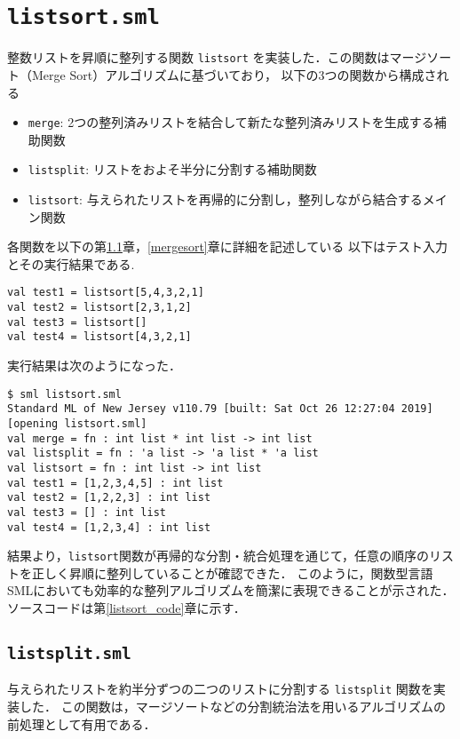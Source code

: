 \documentclass[autodetect-engine,dvi=dvipdfmx,ja=standard,
               a4j,11pt]{bxjsarticle}
\begin{document}
\section{\texttt{listsort.sml}}
整数リストを昇順に整列する関数 \verb|listsort| を実装した．この関数はマージソート（Merge Sort）アルゴリズムに基づいており，
以下の3つの関数から構成される
\begin{itemize}
  \item \texttt{merge}: 2つの整列済みリストを結合して新たな整列済みリストを生成する補助関数
  \item \texttt{listsplit}: リストをおよそ半分に分割する補助関数
  \item \texttt{listsort}: 与えられたリストを再帰的に分割し，整列しながら結合するメイン関数
\end{itemize}
各関数を以下の第\ref{listsplit}章，\ref{mergesort}章に詳細を記述している
以下はテスト入力とその実行結果である.
\begin{Verbatim}
val test1 = listsort[5,4,3,2,1]
val test2 = listsort[2,3,1,2]
val test3 = listsort[]
val test4 = listsort[4,3,2,1]
\end{Verbatim}
実行結果は次のようになった．
\begin{Verbatim}
$ sml listsort.sml 
Standard ML of New Jersey v110.79 [built: Sat Oct 26 12:27:04 2019]
[opening listsort.sml]
val merge = fn : int list * int list -> int list
val listsplit = fn : 'a list -> 'a list * 'a list
val listsort = fn : int list -> int list
val test1 = [1,2,3,4,5] : int list
val test2 = [1,2,2,3] : int list
val test3 = [] : int list
val test4 = [1,2,3,4] : int list  
\end{Verbatim}
結果より，\texttt{listsort}関数が再帰的な分割・統合処理を通じて，任意の順序のリストを正しく昇順に整列していることが確認できた．
このように，関数型言語SMLにおいても効率的な整列アルゴリズムを簡潔に表現できることが示された．
ソースコードは第\ref{listsort_code}章に示す．
\subsection{\texttt{listsplit.sml}}\label{listsplit}
与えられたリストを約半分ずつの二つのリストに分割する \verb|listsplit| 関数を実装した．
この関数は，マージソートなどの分割統治法を用いるアルゴリズムの前処理として有用である．
\end{document}
